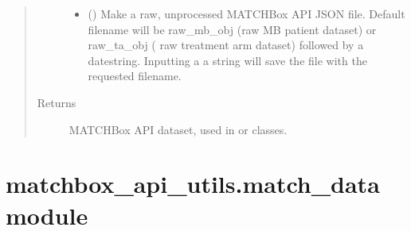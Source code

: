\documentclass[letterpaper,10pt,english]{sphinxmanual}
\begin{document}
\begin{fulllineitems}
\begin{quote}
\begin{description}
\begin{itemize}
\item {} 
 () \textendash{} Make a raw, unprocessed MATCHBox API JSON file. Default
filename will be raw\_mb\_obj (raw MB patient dataset) or raw\_ta\_obj (
raw treatment arm dataset) followed by a datestring. Inputting a
a string will save the file with the requested filename.

\end{itemize}

\item[{Returns}] \leavevmode
MATCHBox API dataset, used in  or  classes.

\end{description}\end{quote}

\end{fulllineitems}



\section{matchbox\_api\_utils.match\_data module}
\label{\detokenize{matchbox_api_utils:module-matchbox_api_utils.match_data}}\label{\detokenize{matchbox_api_utils:matchbox-api-utils-match-data-module}}
\end{document}
